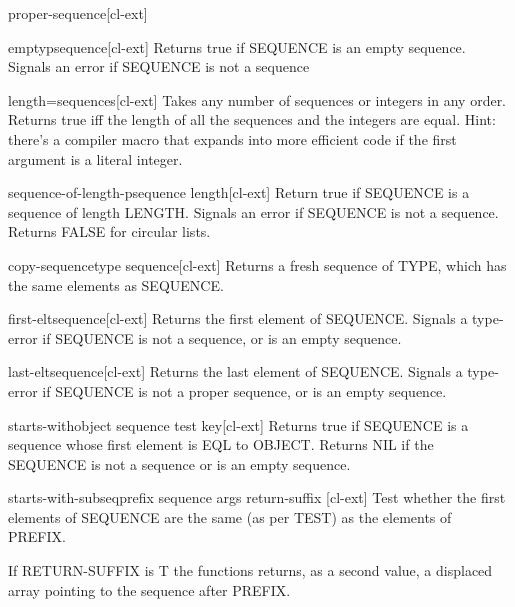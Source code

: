 \begin{type}{proper-sequence}{}[cl-ext]
  
\end{type}

\begin{function}{emptyp}{sequence}[cl-ext]
  Returns true if SEQUENCE is an empty sequence. Signals an error if SEQUENCE
is not a sequence
\end{function}

\begin{function}{length=}{\rest sequences}[cl-ext]
  Takes any number of sequences or integers in any order. Returns true iff
the length of all the sequences and the integers are equal. Hint: there's a
compiler macro that expands into more efficient code if the first argument
is a literal integer.
\end{function}

\begin{function}{sequence-of-length-p}{sequence length}[cl-ext]
  Return true if SEQUENCE is a sequence of length LENGTH. Signals an error if
SEQUENCE is not a sequence. Returns FALSE for circular lists.
\end{function}

\begin{function}{copy-sequence}{type sequence}[cl-ext]
  Returns a fresh sequence of TYPE, which has the same elements as
SEQUENCE.
\end{function}

\begin{function}{first-elt}{sequence}[cl-ext]
  Returns the first element of SEQUENCE. Signals a type-error if SEQUENCE is
not a sequence, or is an empty sequence.
\end{function}

\begin{function}{last-elt}{sequence}[cl-ext]
  Returns the last element of SEQUENCE. Signals a type-error if SEQUENCE is
not a proper sequence, or is an empty sequence.
\end{function}

\begin{function}{starts-with}{object sequence \key test key}[cl-ext]
  Returns true if SEQUENCE is a sequence whose first element is EQL to OBJECT.
Returns NIL if the SEQUENCE is not a sequence or is an empty sequence.
\end{function}

\begin{function}{starts-with-subseq}{prefix sequence \rest args \key return-suffix \akeys}[cl-ext]
  Test whether the first elements of SEQUENCE are the same (as per TEST) as the elements of PREFIX.

If RETURN-SUFFIX is T the functions returns, as a second value, a
displaced array pointing to the sequence after PREFIX.
\end{function}

